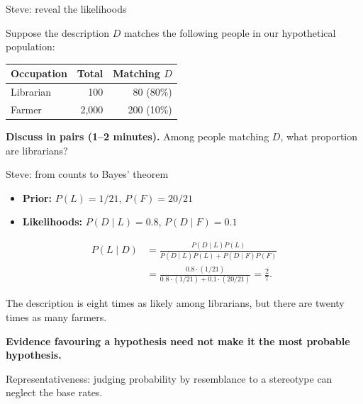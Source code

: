 \documentclass[10pt]{beamer}
\begin{document}
\begin{frame}{Steve: reveal the likelihoods}

  Suppose the description $D$ matches the following people in our
  hypothetical population:

  \begin{center}
    \begin{tabular}{lrr}
      \hline
      Occupation & Total & Matching $D$ \\
      \hline
      Librarian & 100 & 80 (80\%) \\
      Farmer & 2,000 & 200 (10\%) \\
      \hline
    \end{tabular}
  \end{center}

  {\color{uured}\textbf{Discuss in pairs (1--2 minutes).}}
  Among people matching $D$, what proportion are librarians?


\end{frame}


\begin{frame}{Steve: from counts to Bayes' theorem}

  \begin{itemize}
  \item \textbf{Prior:} $P(L)=1/21$, $P(F)=20/21$
  \item \textbf{Likelihoods:} $P(D\mid L)=0.8$, $P(D\mid F)=0.1$
  \end{itemize}

  \[
    \begin{aligned}
      P(L\mid D)
      &=\frac{P(D\mid L)P(L)}{P(D\mid L)P(L)+P(D\mid F)P(F)}\\[0.5em]
      &=\frac{0.8\cdot(1/21)}{0.8\cdot(1/21)+0.1\cdot(20/21)}
        =\frac{2}{7}.
    \end{aligned}
  \]

  The description is eight times as likely among librarians, but there
  are twenty times as many farmers.

  \textbf{Evidence favouring a hypothesis need not make it the most
    probable hypothesis.}

  {\footnotesize Representativeness: judging probability by resemblance
    to a stereotype can neglect the base rates.}

\end{frame}
\end{document}
